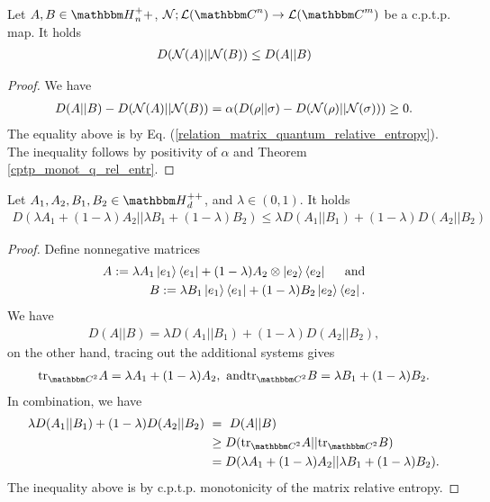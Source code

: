 \begin{corollary}
  Let $A, B \in \bbmH_n^++$, $\cN; \cL(\bbmC^n) \rightarrow \cL(\bbmC^m)$ be a c.p.t.p. map. It holds
  \begin{align}
    D({\mathcal N}(A)|| {\mathcal N}(B)) \leq D(A||B)
  \end{align}
\end{corollary}
\begin{proof}
  We have
  \begin{align}
    D(A||B) - D({\mathcal N}(A)||{\mathcal N}(B)) = \alpha (D(\rho||\sigma) - D({\mathcal N}(\rho)||{\mathcal N}(\sigma))) \geq 0.
  \end{align}
  The equality above is by Eq. (\ref{relation_matrix_quantum_relative_entropy}). The inequality follows by positivity of $\alpha$ and Theorem \ref{cptp_monot_q_rel_entr}.
\end{proof}

\begin{theorem} \label{matrix_relative_entropy_joint_convexity}
  Let $A_1, A_2, B_1, B_2 \in \bbmH_d^{++}$, and $\lambda \in (0,1)$. It holds
  \begin{align}
    D(\lambda A_1 + (1-\lambda) A_2|| \lambda B_1 + (1-\lambda) B_2) \leq \lambda D(A_1||B_1) + (1-\lambda) D(A_2|| B_2)
  \end{align}
\end{theorem}

\begin{proof}
  Define nonnegative matrices
  \begin{align}
    A := \lambda A_1 \ket{e_1}\bra{e_1} + (1-\lambda) A_2 \otimes \ket{e_2}\bra{e_2} \hspace{.5cm} \text{and} \\
    B := \lambda B_1 \ket{e_1}\bra{e_1} + (1-\lambda) B_2 \ket{e_2}\bra{e_2}.
  \end{align}
  We have
  \begin{align}
    D(A||B) = \lambda D(A_1||B_1) + (1 - \lambda) D(A_2||B_2),
  \end{align}
  on the other hand, tracing out the additional systems gives
  \begin{align}
    \tr_{\bbmC^2} A = \lambda A_1 + (1-\lambda) A_2, \ \text{and} \tr_{\bbmC^2} B = \lambda B_1 + (1-\lambda) B_2.
  \end{align}
  In combination, we have
  \begin{align}
    \lambda D(A_1||B_1) + (1-\lambda) D(A_2||B_2) \
     & = \ D(A||B)                                                              \\
     & \geq D(\tr_{\bbmC^2}A|| \tr_{\bbmC^2} B)                                 \\
     & = D(\lambda A_1 + (1 - \lambda) A_2 || \lambda B_1 + (1 - \lambda) B_2).
  \end{align}
  The inequality above is by c.p.t.p. monotonicity of the matrix relative entropy.
\end{proof}

